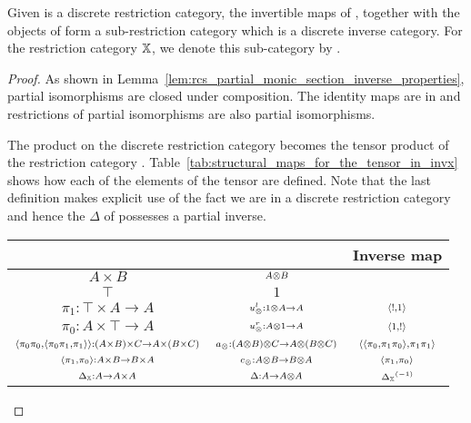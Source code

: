 \begin{proposition}\label{lem:inv_x_is_a_discrete_inverse_category}
  Given \X is a discrete restriction category, the invertible maps of \X, together with the objects
  of \X form a sub-restriction category which is a discrete inverse category. For the restriction
  category $\mathbb{X}$, we denote this sub-category by \Invc{\X}.
\end{proposition}
\begin{proof}
  As shown in Lemma~\ref{lem:rcs_partial_monic_section_inverse_properties}, partial isomorphisms
  are closed under composition. The identity maps are in \Invc{\X} and restrictions of
  partial isomorphisms are also partial isomorphisms.

  The product on the discrete restriction category \X becomes the tensor product of the restriction
  category \Invc{\X}. Table~\ref{tab:structural_maps_for_the_tensor_in_invx} shows how each of the
  elements of the tensor are defined. Note that the last definition makes explicit use of the fact
  we are in a discrete restriction category and hence the $\Delta$ of \X possesses a partial
  inverse.

  \begin{table}[h!]
    \begin{center}
      \begin{tabular}{|ccc|}
        \hline
        \X & \Invc{\X} & Inverse map\\
        \hline\hline
        $\scriptstyle A\times B$ & $\scriptstyle A\otimes B$ &\\
        \hline
        $\scriptstyle \top$ & $\scriptstyle 1$ &\\
        \hline
        $\scriptstyle \pi_1:\top\times A \to A$ & $\scriptstyle u_{\otimes}^l:1\otimes A \to A$ & $\scriptstyle \langle!,1\rangle$\\
        \hline
        $\scriptstyle \pi_0:A\times\top \to A$ & $\scriptstyle u_{\otimes}^r:A\otimes1 \to A$& $\scriptstyle \langle1,!\rangle$\\
        \hline
        ${\scriptstyle \langle\pi_0 \pi_0,\langle\pi_0 \pi_1,\pi_1\rangle\rangle:(A\times B)\times C \to A\times(B\times C)}$
          & $\scriptstyle a_{\otimes}:(A\otimes B)\otimes C \to A\otimes(B\otimes C)$
          & $\scriptstyle \langle\langle\pi_0, \pi_1 \pi_0\rangle,\pi_1 \pi_1\rangle$\\
        \hline
        $\scriptstyle \langle \pi_1,\pi_0\rangle:A\times B \to B\times A$ & $\scriptstyle c_{\otimes}:A\otimes B \to B \otimes A$ & $\scriptstyle \langle \pi_1,\pi_0\rangle$\\
        \hline
        $\scriptstyle \Delta_{\mathbb{X}}:A\to A\times A$ & $\scriptstyle \Delta:A \to A\otimes A$ & $\scriptstyle  {\Delta_{\ensuremath{\mathbb{X}}}}^{(-1)} $\\
        \hline
      \end{tabular}


\end{center}
\end{table}
\end{proof}
